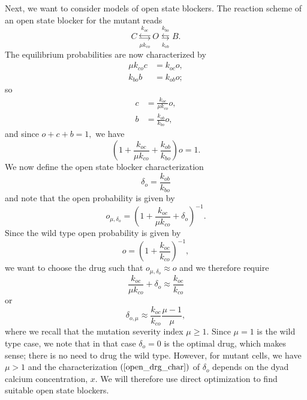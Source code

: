 Next, we want to consider models of open state blockers. The reaction scheme of an open state blocker for the mutant reads
\[
C\underset{\mu k_{co}}{\overset{k_{oc}}{\leftrightarrows}}O\underset{k_{ob}
}{\overset{k_{bo}}{\leftrightarrows}}B.
\]
The equilibrium probabilities are now characterized by
\begin{align*}
\mu k_{co}c  &  =k_{oc}o,\\
k_{bo}b  &  =k_{ob}o;
\end{align*}
so
\begin{align*}
c  &  =\frac{k_{oc}}{\mu k_{co}}o,\\
b  &  =\frac{k_{ob}}{k_{bo}}o,
\end{align*}
and since $o+c+b=1,$ we have
\[
\left(  1+\frac{k_{oc}}{\mu k_{co}}+\frac{k_{ob}}{k_{bo}}\right)  o=1.
\]
We now define the open state blocker characterization
\[
\delta_{o}=\frac{k_{ob}}{k_{bo}}
\]
and note that the open probability is given by
\[
o_{\mu,\delta_{o}}=\left(  1+\frac{k_{oc}}{\mu k_{co}}+\delta_{o}\right)  ^{-1}.
\]
Since the wild type open probability is given by
\[
o=\left(  1+\frac{k_{oc}}{k_{co}}\right)  ^{-1},
\]
we want to choose the drug such that $o_{\mu,\delta_{o}}\approx o$ and we therefore 
require
\[
\frac{k_{oc}}{\mu k_{co}}+\delta_{o}\approx\frac{k_{oc}}{k_{co}}
\]
or
\begin{equation}
\delta_{o,\mu}\approx\frac{k_{oc}}{k_{co}}\frac{\mu-1}{\mu},
\label{open_drg_char}
\end{equation}
where we recall that the mutation severity index $\mu\geqslant1.$ Since
$\mu=1$ is the wild type case, we note that in that case $\delta_{o}=0$ is the
optimal drug, which makes sense; there is no need to drug the wild type. 
However, for
mutant cells, we have $\mu>1$ and the characterization $\left(
\ref{open_drg_char}\right)  $ of $\delta_{o}$ depends on the
dyad calcium concentration, $x.$ We will therefore use direct optimization to
find suitable open state blockers.

